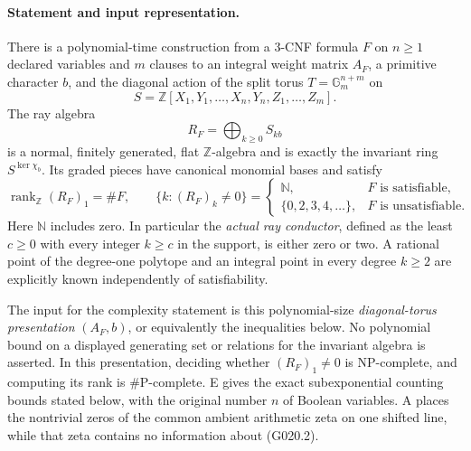 \paragraph{Statement and input representation.}
There is a polynomial-time construction from a $3$-CNF formula $F$
on $n\geq1$ declared variables and $m$ clauses to an integral weight
matrix $A_F$, a primitive character $b$, and the diagonal action of
the split torus $T=\mathbb G_m^{n+m}$ on
\[
 S=\mathbb Z[X_1,Y_1,\ldots,X_n,Y_n,Z_1,\ldots,Z_m].
\]
The ray algebra
\[
 R_F=\bigoplus_{k\geq0}S_{kb}
 \tag{G020.1}
\]
is a normal, finitely generated, flat $\mathbb Z$-algebra and is
exactly the invariant ring $S^{\ker\chi_b}$. Its graded pieces have
canonical monomial bases and satisfy
\[
 \operatorname{rank}_{\mathbb Z}(R_F)_1=\#F,
 \qquad
 \{k:(R_F)_k\ne0\}=
 \begin{cases}
  \mathbb N,&F\text{ is satisfiable},\\
  \{0,2,3,4,\ldots\},&F\text{ is unsatisfiable}.
 \end{cases}
 \tag{G020.2}
\]
Here $\mathbb N$ includes zero. In particular the \emph{actual ray
conductor}, defined as the least $c\geq0$ with every integer $k\geq c$
in the support, is either zero or two. A rational point of the
degree-one polytope and an integral point in every degree $k\geq2$
are explicitly known independently of satisfiability.

The input for the complexity statement is this polynomial-size
\emph{diagonal-torus presentation} $(A_F,b)$, or equivalently the
inequalities below. No polynomial bound on a displayed generating
set or relations for the invariant algebra is asserted. In this
presentation, deciding whether $(R_F)_1\ne0$ is NP-complete, and
computing its rank is \#P-complete. E gives the exact subexponential
counting bounds stated below, with the original number $n$ of
Boolean variables. A places the nontrivial zeros of the common
ambient arithmetic zeta on one shifted line, while that zeta
contains no information about (G020.2).

